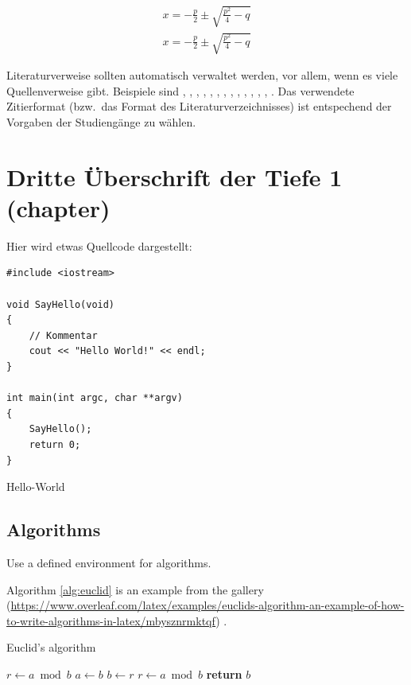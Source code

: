\documentclass[Master,BMR,english]{BASE/twbook}
\begin{document}
\begin{align}
x = -\frac{p}{2}\pm\sqrt{\frac{p^2}{4}-q}\label{Gl1}
\end{align}
\begin{align}
x = -\frac{p}{2}\pm\sqrt{\frac{p^2}{4}-q}\label{Gl2}
\end{align}

Literaturverweise sollten automatisch verwaltet werden, vor allem, wenn es viele Quellenverweise gibt. Beispiele sind \cite{tepNet2024}  \cite{Ko05a}, \cite{Ko05b}, \cite{MiGo05}, \cite{TeGo14}, \cite{HuHa07}, \cite{HuZi10}, \cite{ZiKu07}, \cite{He07}, \cite{SIE11}, \cite{SIE14}, \cite{ISO98}, \cite{ATM11}, \cite{Hu11}, \cite{Po10}. Das verwendete Zitierformat (bzw.~das Format des Literaturverzeichnisses) ist entspechend der Vorgaben der Studiengänge zu wählen.
\clearpage                                                       %
\chapter{Dritte Überschrift der Tiefe 1 (chapter)}
Hier wird etwas Quellcode dargestellt:
\begin{listing}[htbp]
\begin{verbatim}
#include <iostream>

void SayHello(void)
{
    // Kommentar
    cout << "Hello World!" << endl;
}

int main(int argc, char **argv)
{
    SayHello();
    return 0;
}
\end{verbatim}
\caption{Hello-World}
\end{listing}


\section{Algorithms}


Use a defined environment for algorithms.

Algorithm \ref{alg:euclid} is an example from the gallery (\url{https://www.overleaf.com/latex/examples/euclids-algorithm-an-example-of-how-to-write-algorithms-in-latex/mbysznrmktqf}) .
\begin{algorithm}
\caption{Euclid’s algorithm}\label{alg:euclid}
\begin{algorithmic}[1]
\State $r\gets a\bmod b$
\State $a\gets b$
\State $b\gets r$
\State $r\gets a\bmod b$
\EndWhile\label{euclidendwhile}
\State \textbf{return} $b$
\EndProcedure
\end{algorithmic}
\end{algorithm}
\clearpage                                                       %
\end{document}
